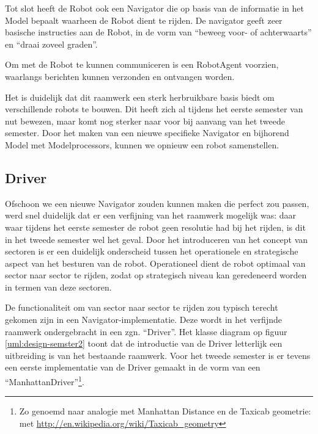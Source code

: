 \documentclass[12pt,a4paper]{report}
\begin{document}
Tot slot heeft de Robot ook een Navigator die op basis van de informatie in het Model bepaalt waarheen de Robot dient te rijden. De navigator geeft zeer basische instructies aan de Robot, in de vorm van ``beweeg voor- of achterwaarts'' en ``draai zoveel graden''.

Om met de Robot te kunnen communiceren is een RobotAgent voorzien, waarlangs berichten kunnen verzonden en ontvangen worden.

Het is duidelijk dat dit raamwerk een sterk herbruikbare basis biedt om verschillende robots te bouwen. Dit heeft zich al tijdens het eerste semester van nut bewezen, maar komt nog sterker naar voor bij aanvang van het tweede semester. Door het maken van een nieuwe specifieke Navigator en bijhorend Model met Modelprocessors, kunnen we opnieuw een robot samenstellen.

\subsection{Driver}

Ofschoon we een nieuwe Navigator zouden kunnen maken die perfect zou passen, werd snel duidelijk dat er een verfijning van het raamwerk mogelijk was: daar waar tijdens het eerste semester de robot geen resolutie had bij het rijden, is dit in het tweede semester wel het geval. Door het introduceren van het concept van sectoren is er een duidelijk onderscheid tussen het operationele en strategische aspect van het besturen van de robot. Operationeel dient de robot optimaal van sector naar sector te rijden, zodat op strategisch niveau kan geredeneerd worden in termen van deze sectoren.

De functionaliteit om van sector naar sector te rijden zou typisch terecht gekomen zijn in een Navigator-implementatie. Deze wordt in het verfijnde raamwerk ondergebracht in een zgn. ``Driver''. Het klasse diagram op figuur \ref{uml:design-semster2} toont dat de introductie van de Driver letterlijk een uitbreiding is van het bestaande raamwerk. Voor het tweede semester is er tevens een eerste implementatie van de Driver gemaakt in de vorm van een ``ManhattanDriver''\footnote{Zo genoemd naar analogie met Manhattan Distance en de Taxicab geometrie: met \url{http://en.wikipedia.org/wiki/Taxicab_geometry}}. 
\end{document}
